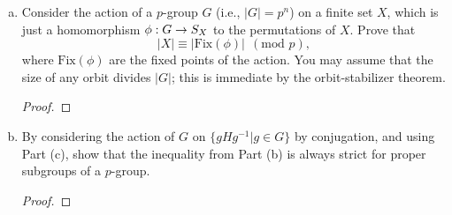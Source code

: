\begin{itemize}
\begin{enumerate}[(a)]
\begin{enumerate}[(i)]
        \item $|\{gHg^{-1}| g \in G\}|$, the number of subgroups conjugate to $H$;

        \item $[G : N_{G}(H)]$, the number of cosets of the normalizer of $H$ in $G$.
    \end{enumerate}
Two of these are always equal to each other, and one can be different. State and prove the correct equality and the inequality.
\begin{proof}

\end{proof}

\item Consider the action of a $p$-group $G$ (i.e., $|G| = p^n$) on a finite set $X$,
which is just a homomorphism $\phi: G \rightarrow S_X$ to the permutations of $X$. Prove that
$$|X| \equiv |\text{Fix}(\phi)| \ \ (\text{mod } p),$$
where $\text{Fix}(\phi)$ are the fixed points of the action. You may assume that the size
of any orbit divides $|G|$; this is immediate by the orbit-stabilizer theorem.
\begin{proof}

\end{proof}

\item By considering the action of $G$ on $\{gHg^{-1}| g \in G\}$ by conjugation,
and using Part (c), show that the inequality from Part (b) is always strict for
proper subgroups of a $p$-group.
\begin{proof}

\end{proof}
\end{enumerate}












\end{itemize}